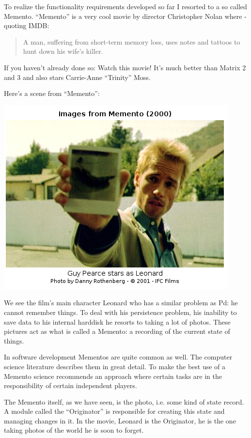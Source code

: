 \documentclass[10pt,english]{scrartcl}
\begin{document}
To realize the functionality requirements developed so far I resorted to a
so called Memento. ``Memento'' is a very cool movie by director
Christopher Nolan where - quoting IMDB:
\begin{quote}

A man, suffering from short-term memory loss, uses notes and tattoos to
hunt down his wife's killer.
\end{quote}

If you haven't already done so: Watch this movie! It's much better than
Matrix 2 and 3 and also stars Carrie-Anne ``Trinity'' Moss.

Here's a scene from ``Memento'':

\includegraphics{memento.png}

We see the film's main character Leonard who has a similar problem as Pd: he
cannot remember things. To deal with his persistence problem, his inability
to save data to his internal harddisk he resorts to taking a lot of photos.
These pictures act as what is called a Memento: a recording of the current
state of things.

In software development Mementos are quite common as well. The computer
science literature describes them in great detail. To make the best use of
a Memento science recommends an approach where certain tasks are in the
responsibility of certain independent players.

The Memento itself, as we have seen, is the photo, i.e. some kind of state
record. A module called the ``Originator'' is responsible for creating this
state and managing changes in it.  In the movie, Leonard is the Originator,
he is the one taking photos of the world he is soon to forget.
\end{document}
